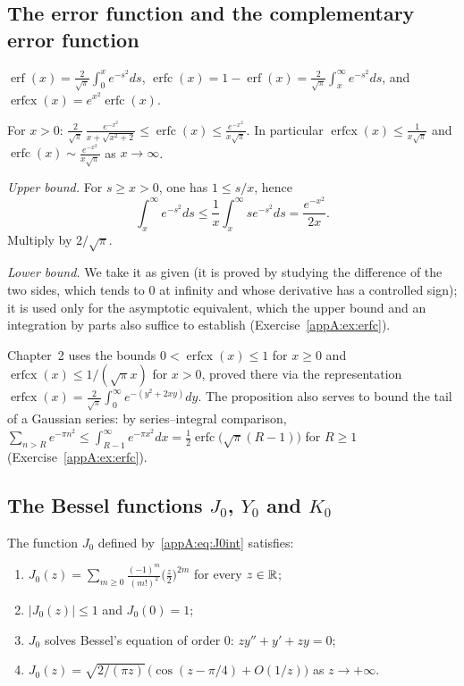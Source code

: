 \subsection{The error function and the complementary error function}
\begin{definition}
$\operatorname{erf}(x)=\frac2{\sqrt\pi}\int_0^xe^{-s^2}ds$, $\operatorname{erfc}(x)=1-\operatorname{erf}(x)=
\frac2{\sqrt\pi}\int_x^\infty e^{-s^2}ds$, and $\operatorname{erfcx}(x)=e^{x^2}\operatorname{erfc}(x)$.
\end{definition}

\begin{proposition}\label{appA:prop:erfc}
For $x>0$: $\displaystyle\frac{2}{\sqrt\pi}\,\frac{e^{-x^2}}{x+\sqrt{x^2+2}}\le\operatorname{erfc}(x)
\le\frac{e^{-x^2}}{x\sqrt\pi}$. In particular $\operatorname{erfcx}(x)\le\frac1{x\sqrt\pi}$ and
$\operatorname{erfc}(x)\sim\frac{e^{-x^2}}{x\sqrt\pi}$ as $x\to\infty$.
\end{proposition}

\begin{humanproof}
\emph{Upper bound.} For $s\ge x>0$, one has $1\le s/x$, hence
\[\int_x^\infty e^{-s^2}ds\le\frac1x\int_x^\infty se^{-s^2}ds=\frac{e^{-x^2}}{2x} .\]
Multiply by $2/\sqrt\pi$.

\emph{Lower bound.} We take it as given \tierL{} (it is proved by studying the difference of the two sides, which
tends to $0$ at infinity and whose derivative has a controlled sign); it is used only for the asymptotic equivalent,
which the upper bound and an integration by parts also suffice to establish (Exercise~\ref{appA:ex:erfc}).
\end{humanproof}
Chapter~2 uses the bounds $0<\operatorname{erfcx}(x)\le1$ for $x\ge0$ and $\operatorname{erfcx}(x)\le1/(\sqrt\pi
x)$ for $x>0$, proved there via the representation $\operatorname{erfcx}(x)=\frac2{\sqrt\pi}\int_0^\infty
e^{-(y^2+2xy)}dy$. The proposition also serves to bound the tail of a Gaussian series: by series--integral comparison,
$\sum_{n>R}e^{-\pi n^2}\le\int_{R-1}^\infty e^{-\pi x^2}dx=\frac12\operatorname{erfc}\bigl(\sqrt\pi(R-1)\bigr)$ for $R\ge1$
(Exercise~\ref{appA:ex:erfc}).

\subsection{The Bessel functions \texorpdfstring{$J_0$}{J0}, \texorpdfstring{$Y_0$}{Y0} and \texorpdfstring{$K_0$}{K0}}

\begin{proposition}[$J_0$]\label{appA:prop:J0}
The function $J_0$ defined by~\eqref{appA:eq:J0int} satisfies:
\begin{enumerate}
\item $J_0(z)=\sum_{m\ge0}\frac{(-1)^m}{(m!)^2}\bigl(\frac z2\bigr)^{2m}$ for every $z\in\mathbb{R}$;
\item $|J_0(z)|\le1$ and $J_0(0)=1$;
\item $J_0$ solves Bessel's equation of order $0$: $zy''+y'+zy=0$;
\item \tierL{} $J_0(z)=\sqrt{2/(\pi z)}\,\bigl(\cos(z-\pi/4)+O(1/z)\bigr)$ as $z\to+\infty$.
\end{enumerate}
\end{proposition}

